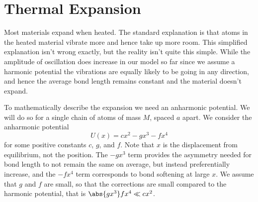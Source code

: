 \documentclass[fleqn]{NotesClass}
\begin{document}
    \section{Thermal Expansion}
    Most materials expand when heated.
    The standard explanation is that atoms in the heated material vibrate more and hence take up more room.
    This simplified explanation isn't wrong exactly, but the reality isn't quite this simple.
    While the amplitude of oscillation does increase in our model so far since we assume a harmonic potential the vibrations are equally likely to be going in any direction, and hence the average bond length remains constant and the material doesn't expand.
    
    To mathematically describe the expansion we need an anharmonic potential.
    We will do so for a single chain of atoms of mass \(M\), spaced \(a\) apart.
    We consider the anharmonic potential
    \begin{equation}
        U(x) = cx^2 - gx^3 - fx^4
    \end{equation}
    for some positive constants \(c\), \(g\), and \(f\).
    Note that \(x\) is the displacement from equilibrium, not the position.
    The \(-gx^3\) term provides the asymmetry needed for bond length to not remain the same on average, but instead preferentially increase, and the \(-fx^4\) term corresponds to bond softening at large \(x\).
    We assume that \(g\) and \(f\) are small, so that the corrections are small compared to the harmonic potential, that is \(\abs{gx^3} fx^4 \ll cx^2\).
    
\end{document}
